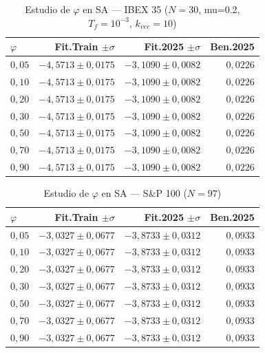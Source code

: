 \documentclass[12pt,a4paper]{article}
\begin{document}
\begin{table}[H]
\centering\footnotesize
\caption{Estudio de $\varphi$ en SA --- IBEX 35 ($N=30$, mu=0.2, $T_f=10^{-3}$, $k_{vec}=10$)}
\begin{tabular}{lrrr}
\toprule
$\varphi$ & \textbf{Fit.Train} $\pm\sigma$ & \textbf{Fit.2025} $\pm\sigma$ & \textbf{Ben.2025} \\
\midrule
$0{,}05$ & $-4{,}5713 \pm 0{,}0175$ & $-3{,}1090 \pm 0{,}0082$ & $0{,}0226$ \\
$0{,}10$ & $-4{,}5713 \pm 0{,}0175$ & $-3{,}1090 \pm 0{,}0082$ & $0{,}0226$ \\
$0{,}20$ & $-4{,}5713 \pm 0{,}0175$ & $-3{,}1090 \pm 0{,}0082$ & $0{,}0226$ \\
$0{,}30$ & $-4{,}5713 \pm 0{,}0175$ & $-3{,}1090 \pm 0{,}0082$ & $0{,}0226$ \\
$0{,}50$ & $-4{,}5713 \pm 0{,}0175$ & $-3{,}1090 \pm 0{,}0082$ & $0{,}0226$ \\
$0{,}70$ & $-4{,}5713 \pm 0{,}0175$ & $-3{,}1090 \pm 0{,}0082$ & $0{,}0226$ \\
$0{,}90$ & $-4{,}5713 \pm 0{,}0175$ & $-3{,}1090 \pm 0{,}0082$ & $0{,}0226$ \\
\bottomrule
\end{tabular}
\end{table}

\begin{table}[H]
\centering\footnotesize
\caption{Estudio de $\varphi$ en SA --- S\&P 100 ($N=97$)}
\begin{tabular}{lrrr}
\toprule
$\varphi$ & \textbf{Fit.Train} $\pm\sigma$ & \textbf{Fit.2025} $\pm\sigma$ & \textbf{Ben.2025} \\
\midrule
$0{,}05$ & $-3{,}0327 \pm 0{,}0677$ & $-3{,}8733 \pm 0{,}0312$ & $0{,}0933$ \\
$0{,}10$ & $-3{,}0327 \pm 0{,}0677$ & $-3{,}8733 \pm 0{,}0312$ & $0{,}0933$ \\
$0{,}20$ & $-3{,}0327 \pm 0{,}0677$ & $-3{,}8733 \pm 0{,}0312$ & $0{,}0933$ \\
$0{,}30$ & $-3{,}0327 \pm 0{,}0677$ & $-3{,}8733 \pm 0{,}0312$ & $0{,}0933$ \\
$0{,}50$ & $-3{,}0327 \pm 0{,}0677$ & $-3{,}8733 \pm 0{,}0312$ & $0{,}0933$ \\
$0{,}70$ & $-3{,}0327 \pm 0{,}0677$ & $-3{,}8733 \pm 0{,}0312$ & $0{,}0933$ \\
$0{,}90$ & $-3{,}0327 \pm 0{,}0677$ & $-3{,}8733 \pm 0{,}0312$ & $0{,}0933$ \\
\bottomrule
\end{tabular}
\end{table}
\end{document}
